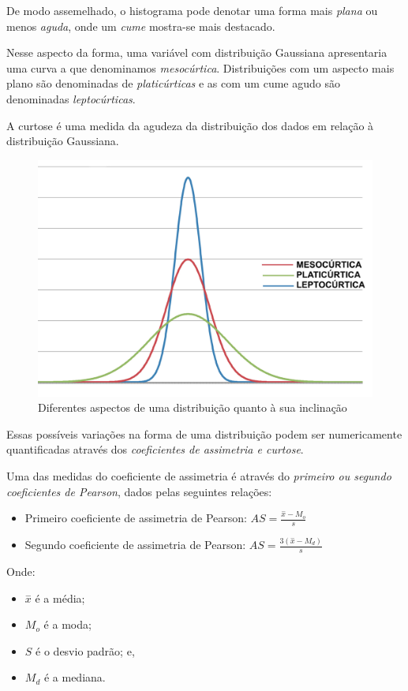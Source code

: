 \documentclass[
]{book}
\providecommand{\tightlist}{%
  \setlength{\itemsep}{0pt}\setlength{\parskip}{0pt}}
\begin{document}
De modo assemelhado, o histograma pode denotar uma forma mais \emph{plana} ou menos \emph{aguda}, onde um \emph{cume} mostra-se mais destacado.

Nesse aspecto da forma, uma variável com distribuição Gaussiana apresentaria uma curva a que denominamos \emph{mesocúrtica}. Distribuições com um aspecto mais plano são denominadas de \emph{platicúrticas} e as com um cume agudo são denominadas \emph{leptocúrticas}.

A curtose é uma medida da agudeza da distribuição dos dados em relação à distribuição Gaussiana.

\begin{figure}

{\centering \includegraphics[width=0.5\linewidth]{images3/curtose} 

}

\caption{Diferentes aspectos de uma distribuição quanto à sua inclinação}\label{fig:unnamed-chunk-50}
\end{figure}

Essas possíveis variações na forma de uma distribuição podem ser numericamente quantificadas através dos \emph{coeficientes de assimetria e curtose}.

Uma das medidas do coeficiente de assimetria é através do \emph{primeiro ou segundo coeficientes de Pearson}, dados pelas seguintes relações:

\begin{itemize}
\tightlist
\item
  Primeiro coeficiente de assimetria de Pearson: \(AS= \frac{ \stackrel{-}{x} - M_{o} }{ s }\)
\item
  Segundo coeficiente de assimetria de Pearson: \(AS = \frac{ 3 ( \stackrel{-}{x} - M_{d}) } { s }\)
\end{itemize}

Onde:

\begin{itemize}
\tightlist
\item
  \(\stackrel{-}{x}\) é a média;
\item
  \(M_{o}\) é a moda;
\item
  \(S\) é o desvio padrão; e,
\item
  \(M_{d}\) é a mediana.
\end{itemize}
\end{document}
